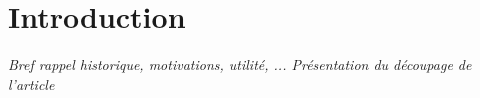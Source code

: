 \section{Introduction}
\textit{Bref rappel historique, motivations, utilité, ... Présentation du découpage de l'article}